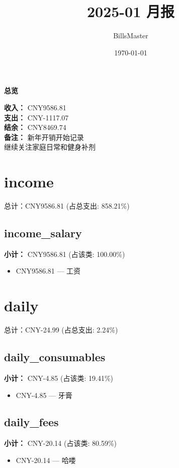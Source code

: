 \documentclass[12pt]{article}
\title{2025-01 月报}
\author{BillsMaster}
\date{\today}
\begin{document}
\maketitle

\vspace{1em}
\hrulefill
\begin{center}
    {\Large\bfseries 总览}\par\vspace{1em}
    {\large
    \textbf{收入：} CNY9586.81\\
    \textbf{支出：} CNY-1117.07\\
    \textbf{结余：} CNY8469.74\\
    \textbf{备注：} 新年开销开始记录\\
    继续关注家庭日常和健身补剂
    }
\end{center}
\hrulefill

\section*{income}
总计：CNY9586.81 	 (占总支出: 858.21\%)

\subsection*{income\_salary}
\textbf{小计：} CNY9586.81 (占该类: 100.00\%)
\begin{itemize}
    \item CNY9586.81 --- 工资
\end{itemize}
\section*{daily}
总计：CNY-24.99 	 (占总支出: 2.24\%)

\subsection*{daily\_consumables}
\textbf{小计：} CNY-4.85 (占该类: 19.41\%)
\begin{itemize}
    \item CNY-4.85 --- 牙膏
\end{itemize}
\subsection*{daily\_fees}
\textbf{小计：} CNY-20.14 (占该类: 80.59\%)
\begin{itemize}
    \item CNY-20.14 --- 哈喽
\end{itemize}
\end{document}
